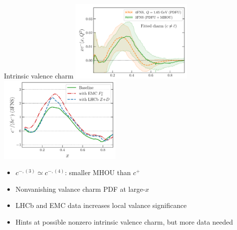 \documentclass[aspectratio=43, 8pt,t]{beamer}
\begin{document}
\begin{frame}{Intrinsic valence charm}
  \includegraphics[width=0.45\textwidth]{valence_3fns_vs_4fns.png}
  \includegraphics[width=0.45\textwidth]{valence_evidence.png}

  \vspace*{1em}
  \begin{itemize}
    \item $c^{-,(3)} \simeq c^{-,(4)}$: smaller MHOU than $c^+$
    \item Nonvanishing valance charm PDF at large-$x$
    \item LHCb and EMC data increases local valance significance
    \item Hints at possible nonzero intrinsic valence charm, but more data needed
  \end{itemize}
\end{frame}
\end{document}
